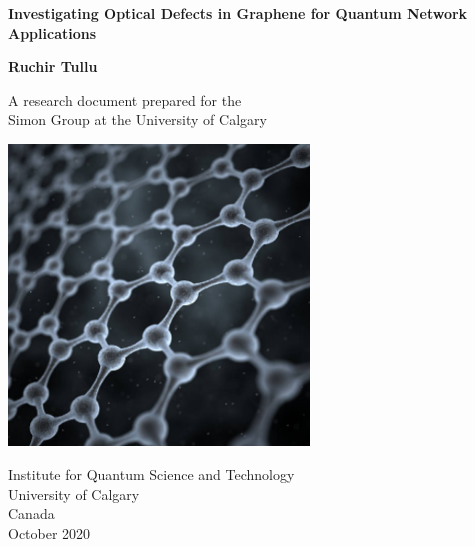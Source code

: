 \begin{titlepage}
	    \begin{center}
		\vspace*{1cm}
		
		\Huge
		\textbf{Investigating Optical Defects in Graphene for Quantum Network Applications}
		
		
		\vspace{0.5cm}	%
		\large
		\textbf{Ruchir Tullu}
		
		\vfill
		
		\large
		A research document prepared for the \\
		Simon Group at the University of Calgary
		
		\vspace{0.8cm}
		
		\includegraphics[width=0.6\textwidth]{graphene.PNG}
		
		\vfill
		
		\Large
		Institute for Quantum Science and Technology\\
		University of Calgary\\
		Canada\\
		October 2020
		
	\end{center}
\end{titlepage}